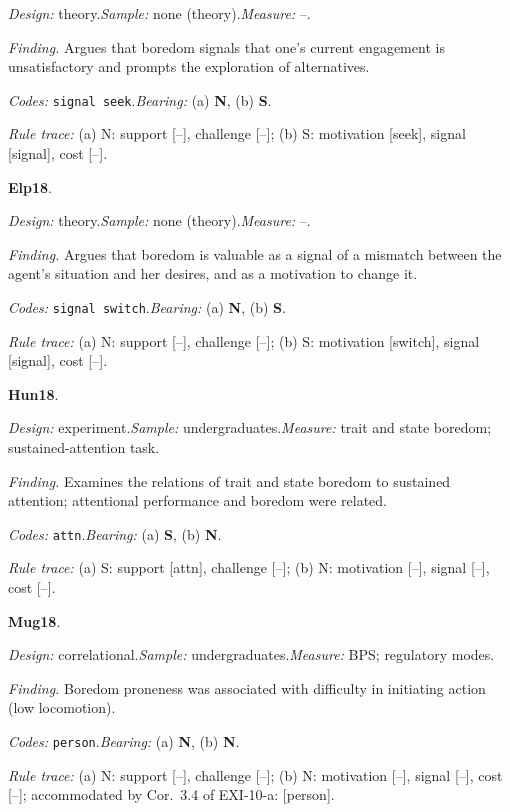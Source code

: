 {\small\noindent\textit{Design:} theory.\quad \textit{Sample:} none (theory).\quad \textit{Measure:} --.\par
\noindent\textit{Finding.} Argues that boredom signals that one's current engagement is unsatisfactory and prompts the exploration of alternatives.\par
\noindent\textit{Codes:} \texttt{signal seek}.\quad \textit{Bearing:} (a) \textbf{N}, (b) \textbf{S}.\par
\noindent\textit{Rule trace:} (a) N: support {[}--{]}, challenge {[}--{]}; (b) S: motivation {[}seek{]}, signal {[}signal{]}, cost {[}--{]}.\par}
\medskip
{}
\noindent\textbf{Elp18}\enspace \citet{Elpidorou2018}.\par
{\small\noindent\textit{Design:} theory.\quad \textit{Sample:} none (theory).\quad \textit{Measure:} --.\par
\noindent\textit{Finding.} Argues that boredom is valuable as a signal of a mismatch between the agent's situation and her desires, and as a motivation to change it.\par
\noindent\textit{Codes:} \texttt{signal switch}.\quad \textit{Bearing:} (a) \textbf{N}, (b) \textbf{S}.\par
\noindent\textit{Rule trace:} (a) N: support {[}--{]}, challenge {[}--{]}; (b) S: motivation {[}switch{]}, signal {[}signal{]}, cost {[}--{]}.\par}
\medskip
{}
\noindent\textbf{Hun18}\enspace \citet{HunterEastwood2018}.\par
{\small\noindent\textit{Design:} experiment.\quad \textit{Sample:} undergraduates.\quad \textit{Measure:} trait and state boredom; sustained-attention task.\par
\noindent\textit{Finding.} Examines the relations of trait and state boredom to sustained attention; attentional performance and boredom were related.\par
\noindent\textit{Codes:} \texttt{attn}.\quad \textit{Bearing:} (a) \textbf{S}, (b) \textbf{N}.\par
\noindent\textit{Rule trace:} (a) S: support {[}attn{]}, challenge {[}--{]}; (b) N: motivation {[}--{]}, signal {[}--{]}, cost {[}--{]}.\par}
\medskip
{}
\noindent\textbf{Mug18}\enspace \citet{Mugon2018}.\par
{\small\noindent\textit{Design:} correlational.\quad \textit{Sample:} undergraduates.\quad \textit{Measure:} BPS; regulatory modes.\par
\noindent\textit{Finding.} Boredom proneness was associated with difficulty in initiating action (low locomotion).\par
\noindent\textit{Codes:} \texttt{person}.\quad \textit{Bearing:} (a) \textbf{N}, (b) \textbf{N}.\par
\noindent\textit{Rule trace:} (a) N: support {[}--{]}, challenge {[}--{]}; (b) N: motivation {[}--{]}, signal {[}--{]}, cost {[}--{]}; accommodated by Cor.~3.4 of EXI-10-a: {[}person{]}.\par}
